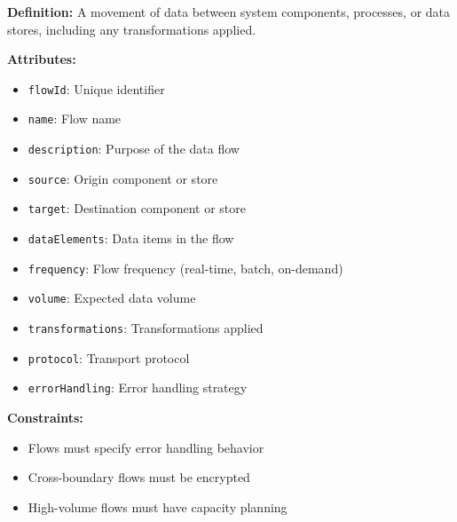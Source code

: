 \documentclass[11pt,letterpaper]{article}
\begin{document}
\begin{definitionbox}
\textbf{Definition:} A movement of data between system components, processes, or data stores, including any transformations applied.

\textbf{Attributes:}
\begin{itemize}[nosep]
    \item \texttt{flowId}: Unique identifier
    \item \texttt{name}: Flow name
    \item \texttt{description}: Purpose of the data flow
    \item \texttt{source}: Origin component or store
    \item \texttt{target}: Destination component or store
    \item \texttt{dataElements}: Data items in the flow
    \item \texttt{frequency}: Flow frequency (real-time, batch, on-demand)
    \item \texttt{volume}: Expected data volume
    \item \texttt{transformations}: Transformations applied
    \item \texttt{protocol}: Transport protocol
    \item \texttt{errorHandling}: Error handling strategy
\end{itemize}

\textbf{Constraints:}
\begin{itemize}[nosep]
    \item Flows must specify error handling behavior
    \item Cross-boundary flows must be encrypted
    \item High-volume flows must have capacity planning
\end{itemize}
\end{definitionbox}
\end{document}
